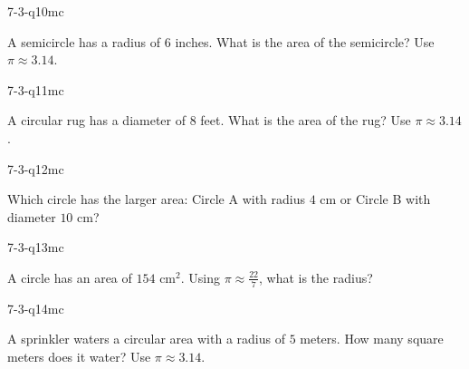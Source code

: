 \begin{practiceQuestion}{7-3-q10}{mc}
\begin{questionText}
A semicircle has a radius of $6$ inches. What is the area of the semicircle? Use $\pi \approx 3.14$.
\end{questionText}
\end{practiceQuestion}

\begin{practiceQuestion}{7-3-q11}{mc}
\begin{questionText}
A circular rug has a diameter of $8$ feet. What is the area of the rug? Use $\pi \approx 3.14$.
\end{questionText}
\end{practiceQuestion}

\begin{practiceQuestion}{7-3-q12}{mc}
\begin{questionText}
Which circle has the larger area: Circle A with radius $4$ cm or Circle B with diameter $10$ cm?
\end{questionText}
\end{practiceQuestion}

\begin{practiceQuestion}{7-3-q13}{mc}
\begin{questionText}
A circle has an area of $154$ cm$^2$. Using $\pi \approx \frac{22}{7}$, what is the radius?
\end{questionText}
\end{practiceQuestion}

\begin{practiceQuestion}{7-3-q14}{mc}
\begin{questionText}
A sprinkler waters a circular area with a radius of $5$ meters. How many square meters does it water? Use $\pi \approx 3.14$.
\end{questionText}
\end{practiceQuestion}


